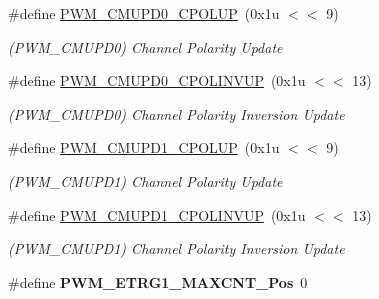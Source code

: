 \begin{DoxyCompactItemize}
\item 
\mbox{\label{group__SAMV71__PWM_ga56fd5395da2c945ec0e94ebde1670a25}} 
\#define \mbox{\hyperlink{group__SAMV71__PWM_ga56fd5395da2c945ec0e94ebde1670a25}{P\+W\+M\+\_\+\+C\+M\+U\+P\+D0\+\_\+\+C\+P\+O\+L\+UP}}~(0x1u $<$$<$ 9)
\begin{DoxyCompactList}\small\item\em (P\+W\+M\+\_\+\+C\+M\+U\+P\+D0) Channel Polarity Update \end{DoxyCompactList}\item 
\mbox{\label{group__SAMV71__PWM_gaeacc079939259afb417d8e9fb9ff4300}} 
\#define \mbox{\hyperlink{group__SAMV71__PWM_gaeacc079939259afb417d8e9fb9ff4300}{P\+W\+M\+\_\+\+C\+M\+U\+P\+D0\+\_\+\+C\+P\+O\+L\+I\+N\+V\+UP}}~(0x1u $<$$<$ 13)
\begin{DoxyCompactList}\small\item\em (P\+W\+M\+\_\+\+C\+M\+U\+P\+D0) Channel Polarity Inversion Update \end{DoxyCompactList}\item 
\mbox{\label{group__SAMV71__PWM_ga383258dd68353cc8e9cdb6e4685da924}} 
\#define \mbox{\hyperlink{group__SAMV71__PWM_ga383258dd68353cc8e9cdb6e4685da924}{P\+W\+M\+\_\+\+C\+M\+U\+P\+D1\+\_\+\+C\+P\+O\+L\+UP}}~(0x1u $<$$<$ 9)
\begin{DoxyCompactList}\small\item\em (P\+W\+M\+\_\+\+C\+M\+U\+P\+D1) Channel Polarity Update \end{DoxyCompactList}\item 
\mbox{\label{group__SAMV71__PWM_gaa50bff84255cf8d47bb7e2c4e775b5ee}} 
\#define \mbox{\hyperlink{group__SAMV71__PWM_gaa50bff84255cf8d47bb7e2c4e775b5ee}{P\+W\+M\+\_\+\+C\+M\+U\+P\+D1\+\_\+\+C\+P\+O\+L\+I\+N\+V\+UP}}~(0x1u $<$$<$ 13)
\begin{DoxyCompactList}\small\item\em (P\+W\+M\+\_\+\+C\+M\+U\+P\+D1) Channel Polarity Inversion Update \end{DoxyCompactList}\item 
\mbox{\label{group__SAMV71__PWM_ga07652b57aad184fdb87e8a849d38175e}} 
\#define {\bfseries P\+W\+M\+\_\+\+E\+T\+R\+G1\+\_\+\+M\+A\+X\+C\+N\+T\+\_\+\+Pos}~0
\item 

\end{DoxyCompactItemize}
